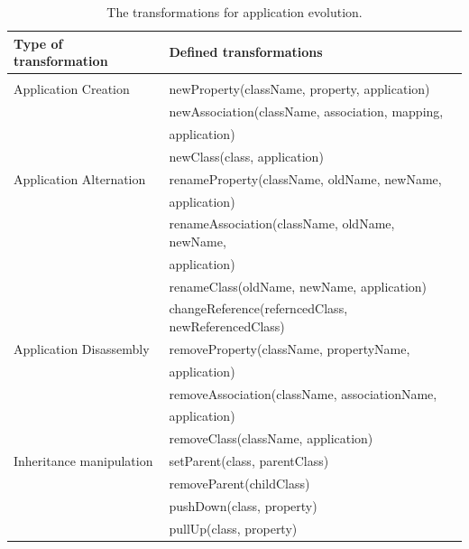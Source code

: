 \documentclass[runningheads]{comsis}
\begin{document}
\begin{table}
\caption{The transformations for application evolution.}
	\label{tab:app-evolution}
\centering
	\begin{tabular}{ll}
	\hline
	Type of transformation & Defined transformations \\
	\hline
	\\[-2ex] 
	Application Creation
	& newProperty(className, property, application) \\
	& newAssociation(className, association, mapping, \\ &  \hspace{0.5in}application) \\
	&  newClass(class, application) \\
	Application Alternation
		& renameProperty(className, oldName, newName, \\ &  \hspace{0.5in} application) \\
		& renameAssociation(className, oldName, newName, \\ &  \hspace{0.5in}application) \\
		& renameClass(oldName, newName, application)\\
		& changeReference(referncedClass, newReferencedClass) \\
		Application Disassembly 
		& removeProperty(className, propertyName,\\ &  \hspace{0.5in} application) \\
		& removeAssociation(className, associationName, \\ &  \hspace{0.5in}application) \\
		& removeClass(className, application)\\
	Inheritance manipulation   & setParent(class, parentClass) \\
		& removeParent(childClass) \\
		& pushDown(class, property)\\
		& pullUp(class, property)\\
	\hline
	\end{tabular}
\end{table}
\end{document}
